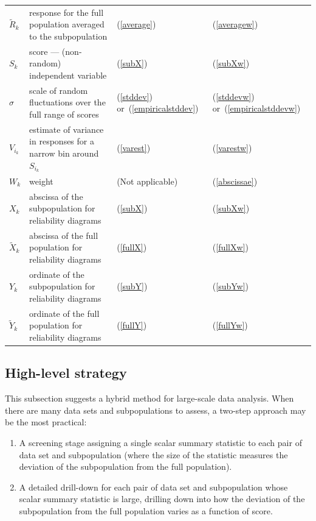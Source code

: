 \documentclass{article}
\begin{document}
\begin{table}
\begin{center}
\begin{tabular}{llll}
$\tilde{R}_k$ & response for the full population averaged to the subpopulation
& (\ref{average}) & (\ref{averagew}) \\
$S_k$ & score --- (non-random) independent variable &
(\ref{subX}) & (\ref{subXw}) \\
$\sigma$ & scale of random fluctuations over the full range of scores &
(\ref{stddev}) or~(\ref{empiricalstddev}) &
(\ref{stddevw}) or~(\ref{empiricalstddevw}) \\
$V_{i_k}$ & estimate of variance in responses for a narrow bin around $S_{i_k}$
& (\ref{varest}) & (\ref{varestw}) \\
$W_k$ & weight & (Not applicable) & (\ref{abscissae}) \\
$X_k$ & abscissa of the subpopulation for reliability diagrams & (\ref{subX}) &
(\ref{subXw}) \\
$\tilde{X}_k$ & abscissa of the full population for reliability diagrams &
(\ref{fullX}) & (\ref{fullXw}) \\
$Y_k$ & ordinate of the subpopulation for reliability diagrams & (\ref{subY}) &
(\ref{subYw}) \\
$\tilde{Y}_k$ & ordinate of the full population for reliability diagrams &
(\ref{fullY}) & (\ref{fullYw}) \\
\hline
\end{tabular}
\end{center}
\end{table}


\subsection{High-level strategy}
\label{high-level}

This subsection suggests a hybrid method for large-scale data analysis.
When there are many data sets and subpopulations to assess,
a two-step approach may be the most practical:
%
\begin{enumerate}
\item A screening stage assigning a single scalar summary statistic
to each pair of data set and subpopulation (where the size of the statistic
measures the deviation of the subpopulation from the full population).
\item A detailed drill-down for each pair of data set and subpopulation
whose scalar summary statistic is large, drilling down into how the deviation
of the subpopulation from the full population varies as a function of score.
\end{enumerate}
\end{document}
